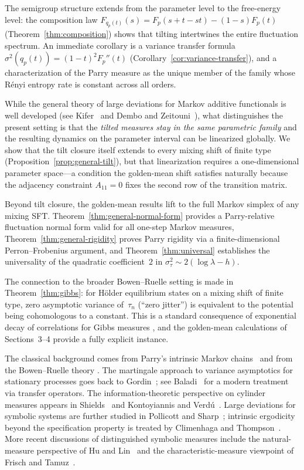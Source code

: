 \documentclass[pdflatex,sn-basic,Numbered]{sn-jnl}
\theoremstyle{thmstyleone}
\theoremstyle{thmstyletwo}
\theoremstyle{thmstylethree}
\begin{document}
The semigroup structure extends from the parameter level to the free-energy level: the composition law $F_{q_p(t)}(s)=F_p(s+t-st)-(1-s)F_p(t)$ (Theorem~\ref{thm:composition}) shows that tilting intertwines the entire fluctuation spectrum. An immediate corollary is a variance transfer formula $\sigma^2(q_p(t))=(1-t)^2 F_p''(t)$ (Corollary~\ref{cor:variance-transfer}), and a characterization of the Parry measure as the unique member of the family whose R\'enyi entropy rate is constant across all orders.

While the general theory of large deviations for Markov additive functionals is well developed (see Kifer~\cite{Kifer1990} and Dembo and Zeitouni~\cite{DemboZeitouni2010}), what distinguishes the present setting is that the \emph{tilted measures stay in the same parametric family} and the resulting dynamics on the parameter interval can be linearized globally. We show that the tilt closure itself extends to every mixing shift of finite type (Proposition~\ref{prop:general-tilt}), but that linearization requires a one-dimensional parameter space---a condition the golden-mean shift satisfies naturally because the adjacency constraint $A_{11}=0$ fixes the second row of the transition matrix.

Beyond tilt closure, the golden-mean results lift to the full Markov simplex of any mixing SFT. Theorem~\ref{thm:general-normal-form} provides a Parry-relative fluctuation normal form valid for all one-step Markov measures, Theorem~\ref{thm:general-rigidity} proves Parry rigidity via a finite-dimensional Perron--Frobenius argument, and Theorem~\ref{thm:universal} establishes the universality of the quadratic coefficient~$2$ in $\sigma^2_\tau\sim 2(\log\lambda-h)$.

The connection to the broader Bowen--Ruelle setting is made in Theorem~\ref{thm:gibbs}: for H\"older equilibrium states on a mixing shift of finite type, zero asymptotic variance of~$\tau_n$ (``zero jitter'') is equivalent to the potential being cohomologous to a constant. This is a standard consequence of exponential decay of correlations for Gibbs measures \cite{Bowen1975,Ruelle1978,ParryPollicott1990,Baladi2000}, and the golden-mean calculations of Sections~3--4 provide a fully explicit instance.

The classical background comes from Parry's intrinsic Markov chains~\cite{Parry1964} and from the Bowen--Ruelle theory \cite{Bowen1975,Ruelle1978,ParryPollicott1990,Walters1982}. The martingale approach to variance asymptotics for stationary processes goes back to Gordin~\cite{Gordin1969}; see Baladi~\cite{Baladi2000} for a modern treatment via transfer operators. The information-theoretic perspective on cylinder measures appears in Shields~\cite{Shields1996} and Kontoyiannis and Verd\'u~\cite{KontoyiannisVerdu2014}. Large deviations for symbolic systems are further studied in Pollicott and Sharp~\cite{PollicottSharp2009}; intrinsic ergodicity beyond the specification property is treated by Climenhaga and Thompson~\cite{ClimenhagaThompson2012}. More recent discussions of distinguished symbolic measures include the natural-measure perspective of Hu and Lin~\cite{HuLin2013} and the characteristic-measure viewpoint of Frisch and Tamuz~\cite{FrischTamuz2022}.
\end{document}
